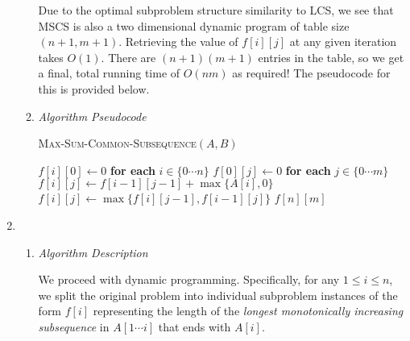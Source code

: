 \documentclass[10pt, letterpaper]{article}
\begin{document}
\begin{enumerate}[label={\bfseries Q\arabic*.}]
\begin{enumerate}
        Due to the optimal subproblem structure similarity to LCS, we see that MSCS is also a two
        dimensional dynamic program of table size $(n+1, m+1)$. Retrieving the value of $f[i][j]$ at any given
        iteration takes $O(1)$. There are $(n+1)(m+1)$ entries in the table, so we get a final, total running
        time of $O(nm)$ as required! The pseudocode for this is provided below.

      \item
        {\itshape Algorithm Pseudocode} \vspace{-4mm}
        \begin{center}
          \begin{minipage}{\linewidth}
            \begin{algorithm}[H]
              \caption{\textsc{Max-Sum-Common-Subsequence}$(A, B)$}\label{alg:max-sum-commmon-subsequence}
              \begin{algorithmic}[1]
                \State $f[i][0] \gets 0$ \textbf{for each} $i \in \{0 \cdots n\}$
                \State $f[0][j] \gets 0$ \textbf{for each} $j \in \{0 \cdots m\}$
                      \State $f[i][j] \gets f[i-1][j-1] + \max\big\{A[i], 0\big\}$
                    \Else
                    \State $f[i][j] \gets \max\big\{f[i][j-1], f[i-1][j]\big\}$
                    \EndIf
                  \EndFor
                \EndFor
                \State \Return $f[n][m]$
              \end{algorithmic}
            \end{algorithm}
          \end{minipage}
        \end{center}
    \end{enumerate}

  \newpage
  \item
    \begin{enumerate}
      \item
        {\itshape Algorithm Description} \\ \vspace{-4mm}

        We proceed with dynamic programming. Specifically, for any $1 \leq i \leq n$, we split the
        original problem into individual subproblem instances of the form $f[i]$ representing the
        length of the \textit{longest monotonically increasing subsequence} in $A[1 \cdots i]$
        that ends with $A[i]$. \\


\end{enumerate}
\end{enumerate}
\end{document}
